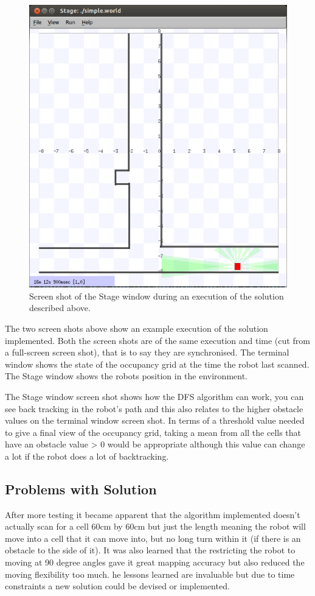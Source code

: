 \documentclass[a4paper,12pt]{article}
\begin{document}
\begin{figure}[H]
\includegraphics[scale=0.9]{robotics7Stage.png}
\caption{Screen shot of the Stage window during an execution of the solution described above.}
\end{figure}

\noindent The two screen shots above show an example execution of the solution implemented. Both the screen shots are of the same execution and time (cut from a full-screen screen shot), that is to say they are synchronised. The terminal window shows the state of the occupancy grid at the time the robot last scanned. The Stage window shows the robots position in the environment.

\vspace{5mm}
\noindent The Stage window screen shot shows how the DFS algorithm can work, you can see back tracking in the robot's path and this also relates to the higher obstacle values on the terminal window screen shot. In terms of a threshold value needed to give a final view of the occupancy grid, taking a mean from all the cells that have an obstacle value > 0 would be appropriate although this value can change a lot if the robot does a lot of backtracking.

\subsection{Problems with Solution}
\noindent After more testing it became apparent that the algorithm implemented doesn't actually scan for a cell 60cm by 60cm but just the length meaning the robot will move into a cell that it can move into, but no long turn within it (if there is an obstacle to the side of it). It was also learned that the restricting the robot to moving at 90 degree angles gave it great mapping accuracy but also reduced the moving flexibility too much. he lessons learned are invaluable but due to time constraints a new solution could be devised or implemented.
\end{document}
